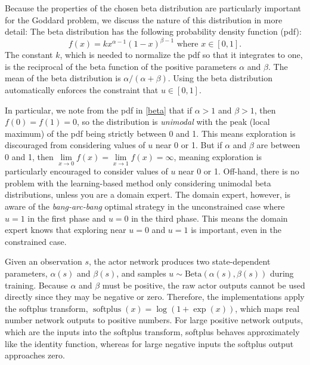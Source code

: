 \documentclass[mnsc,sglanonrev]{informs4}
\begin{document}
Because the properties of the chosen beta distribution are particularly important for the Goddard problem, we discuss the nature of this distribution in more detail: The beta distribution has the following probability density function (pdf):
\begin{equation} \label{beta}
    f(x) = kx^{\alpha-1}(1-x)^{\beta-1} \mbox{ where } x \in [0,1].
\end{equation}
The constant $k$, which is needed to normalize the pdf so that it integrates to one, is the reciprocal of the beta function of the positive parameters $\alpha$ and $\beta$. The mean of the beta distribution is $\alpha/(\alpha+\beta)$. Using the beta distribution automatically enforces the constraint that $u\in [0,1]$. 

In particular, we note from the pdf in \eqref{beta} that if $\alpha>1$ and $\beta>1$, then $f(0) = f(1)=0$, so the distribution is \emph{unimodal} with the peak (local maximum) of the pdf being strictly between 0 and 1. This means exploration is discouraged from considering values of $u$ near 0 or 1. But if $\alpha$ and $\beta$ are between 0 and 1, then $\lim\limits_{x\to 0} f(x) = \lim\limits_{x\to 1} f(x) =\infty$, meaning exploration is particularly encouraged to consider values of $u$ near 0 or 1. Off-hand, there is no problem with the learning-based method only considering unimodal beta distributions, unless you are a domain expert. The domain expert, however, is aware of the \emph{bang-arc-bang} optimal strategy in the unconstrained case where  $u=1$ in the first phase and $u=0$ in the third phase. This means the domain expert knows that exploring near $u=0$ and $u=1$ is important, even in the constrained case.

Given an observation $s$, the actor network produces two state-dependent parameters, $\alpha(s)$ and $\beta(s)$, and samples $u\sim\mathrm{Beta}(\alpha(s),\beta(s))$ during training. Because $\alpha$ and $\beta$ must be positive, the raw actor outputs cannot be used directly since they may be negative or zero. Therefore, the implementations apply the softplus transform, $\operatorname{softplus}(x)=\log(1+\exp(x))$, which maps real number network outputs to positive numbers. For large positive network outputs, which are the inputs into the softplus transform, softplus behaves approximately like the identity function, whereas for large negative inputs the softplus output approaches zero. 

\end{document}
